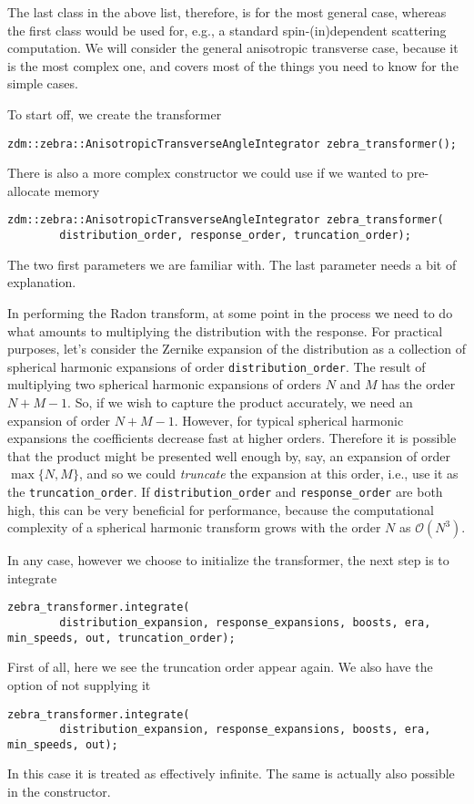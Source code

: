 \documentclass{article}
\begin{document}
The last class in the above list, therefore, is for the most general case, whereas the first class would be used for, e.g., a standard spin-(in)dependent scattering computation. We will consider the general anisotropic transverse case, because it is the most complex one, and covers most of the things you need to know for the simple cases.

To start off, we create the transformer
\begin{verbatim}
zdm::zebra::AnisotropicTransverseAngleIntegrator zebra_transformer();
\end{verbatim}
There is also a more complex constructor we could use if we wanted to pre-allocate memory
\begin{verbatim}
zdm::zebra::AnisotropicTransverseAngleIntegrator zebra_transformer(
        distribution_order, response_order, truncation_order);
\end{verbatim}
The two first parameters we are familiar with. The last parameter needs a bit of explanation.

In performing the Radon transform, at some point in the process we need to do what amounts to multiplying the distribution with the response. For practical purposes, let's consider the Zernike expansion of the distribution as a collection of spherical harmonic expansions of order \texttt{distribution_order}. The result of multiplying two spherical harmonic expansions of orders $N$ and $M$ has the order $N + M - 1$. So, if we wish to capture the product accurately, we need an expansion of order $N + M - 1$. However, for typical spherical harmonic expansions the coefficients decrease fast at higher orders. Therefore it is possible that the product might be presented well enough by, say, an expansion of order $\max\{N,M\}$, and so we could \emph{truncate} the expansion at this order, i.e., use it as the \texttt{truncation_order}. If \texttt{distribution_order} and \texttt{response_order} are both high, this can be very beneficial for performance, because the computational complexity of a spherical harmonic transform grows with the order $N$ as $\mathcal{O}(N^3)$.

In any case, however we choose to initialize the transformer, the next step is to integrate
\begin{verbatim}
zebra_transformer.integrate(
        distribution_expansion, response_expansions, boosts, era, min_speeds, out, truncation_order);
\end{verbatim}
First of all, here we see the truncation order appear again. We also have the option of not supplying it
\begin{verbatim}
zebra_transformer.integrate(
        distribution_expansion, response_expansions, boosts, era, min_speeds, out);
\end{verbatim}
In this case it is treated as effectively infinite. The same is actually also possible in the constructor.
\end{document}

